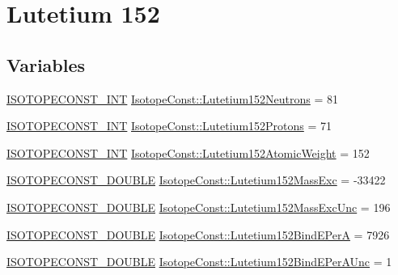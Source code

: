 \hypertarget{group___isotope_const-_lutetium-_lu152}{}\section{Lutetium 152}
\label{group___isotope_const-_lutetium-_lu152}
\subsection*{Variables}
\begin{DoxyCompactItemize}
\item 
\mbox{\hyperlink{group___isotope_const-_macros_ga5f18360b3e99483a35c32d789e62621c}{I\+S\+O\+T\+O\+P\+E\+C\+O\+N\+S\+T\+\_\+\+I\+NT}} \mbox{\hyperlink{group___isotope_const-_lutetium-_lu152_ga85bb0cf552b3901a5e294d84d21d26ae}{Isotope\+Const\+::\+Lutetium152\+Neutrons}} = 81
\item 
\mbox{\hyperlink{group___isotope_const-_macros_ga5f18360b3e99483a35c32d789e62621c}{I\+S\+O\+T\+O\+P\+E\+C\+O\+N\+S\+T\+\_\+\+I\+NT}} \mbox{\hyperlink{group___isotope_const-_lutetium-_lu152_ga7055fe6e51bae41cbf70bf731f678fe6}{Isotope\+Const\+::\+Lutetium152\+Protons}} = 71
\item 
\mbox{\hyperlink{group___isotope_const-_macros_ga5f18360b3e99483a35c32d789e62621c}{I\+S\+O\+T\+O\+P\+E\+C\+O\+N\+S\+T\+\_\+\+I\+NT}} \mbox{\hyperlink{group___isotope_const-_lutetium-_lu152_ga5b1ee1e76420dda66855d5e8ab79ae30}{Isotope\+Const\+::\+Lutetium152\+Atomic\+Weight}} = 152
\item 
\mbox{\hyperlink{group___isotope_const-_macros_ga8f45a7272ce02c0b4c65c44636ed719a}{I\+S\+O\+T\+O\+P\+E\+C\+O\+N\+S\+T\+\_\+\+D\+O\+U\+B\+LE}} \mbox{\hyperlink{group___isotope_const-_lutetium-_lu152_ga1f227fd11fdc6ddaf4b0b8fa7ab64995}{Isotope\+Const\+::\+Lutetium152\+Mass\+Exc}} = -\/33422
\item 
\mbox{\hyperlink{group___isotope_const-_macros_ga8f45a7272ce02c0b4c65c44636ed719a}{I\+S\+O\+T\+O\+P\+E\+C\+O\+N\+S\+T\+\_\+\+D\+O\+U\+B\+LE}} \mbox{\hyperlink{group___isotope_const-_lutetium-_lu152_ga4f5294414f3c2e5a9ab49c1887b2e3a8}{Isotope\+Const\+::\+Lutetium152\+Mass\+Exc\+Unc}} = 196
\item 
\mbox{\hyperlink{group___isotope_const-_macros_ga8f45a7272ce02c0b4c65c44636ed719a}{I\+S\+O\+T\+O\+P\+E\+C\+O\+N\+S\+T\+\_\+\+D\+O\+U\+B\+LE}} \mbox{\hyperlink{group___isotope_const-_lutetium-_lu152_ga31a61c33c0862fafa583c42c82570324}{Isotope\+Const\+::\+Lutetium152\+Bind\+E\+PerA}} = 7926
\item 
\mbox{\hyperlink{group___isotope_const-_macros_ga8f45a7272ce02c0b4c65c44636ed719a}{I\+S\+O\+T\+O\+P\+E\+C\+O\+N\+S\+T\+\_\+\+D\+O\+U\+B\+LE}} \mbox{\hyperlink{group___isotope_const-_lutetium-_lu152_ga112ce9ce59d8ccf7a17ec5a50e45156a}{Isotope\+Const\+::\+Lutetium152\+Bind\+E\+Per\+A\+Unc}} = 1

\end{DoxyCompactItemize}
